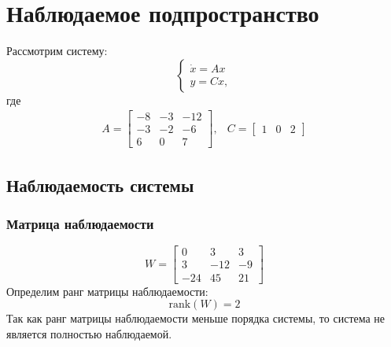 \section{Наблюдаемое подпространство}

Рассмотрим систему: 
\begin{equation}
    \begin{cases}
        \dot{x} = Ax \\
        y = Cx,
    \end{cases}
\end{equation}
где 
\begin{equation}
    \begin{array}{cc}
        A = \begin{bmatrix}
            -8 & -3 & -12 \\
            -3 & -2 & -6 \\
            6 & 0 & 7
        \end{bmatrix}, &
        C = \begin{bmatrix}
            1 & 0 & 2
        \end{bmatrix}
    \end{array}
\end{equation}

\subsection{Наблюдаемость системы}
\subsubsection{Матрица наблюдаемости}
\begin{equation}
    W = \begin{bmatrix}
        0 & 3 & 3 \\
        3 & -12 & -9 \\
        -24 & 45 & 21
        \end{bmatrix}
\end{equation}
Определим ранг матрицы наблюдаемости:
\begin{equation}
    \text{rank}(W) = 2
\end{equation}
Так как ранг матрицы наблюдаемости меньше порядка системы, то система не является полностью наблюдаемой. 

